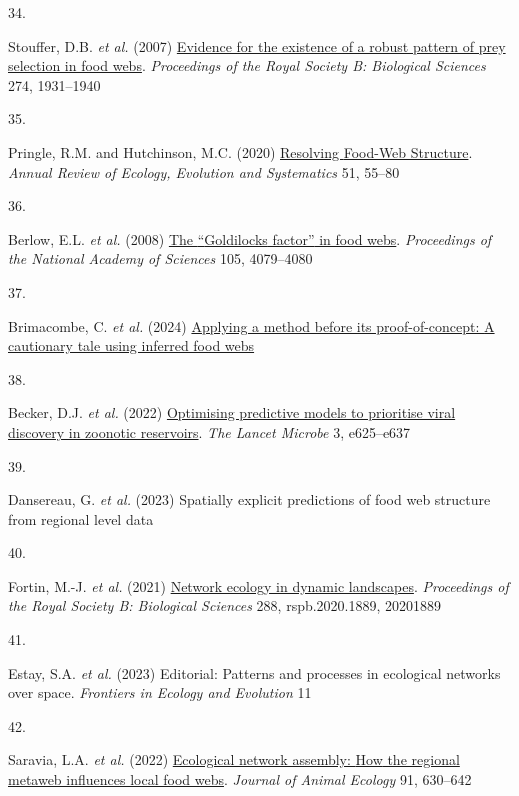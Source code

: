 \documentclass[
]{article}
\newlength{\cslhangindent}
\newlength{\csllabelwidth}
\newenvironment{CSLReferences}[2] %
 {\begin{list}{}{%
  \setlength{\itemindent}{0pt}
  \setlength{\leftmargin}{0pt}
  \setlength{\parsep}{0pt}
  \ifodd #1
   \setlength{\leftmargin}{\cslhangindent}
   \setlength{\itemindent}{-1\cslhangindent}
  \fi
  \setlength{\itemsep}{#2\baselineskip}}}
 {\end{list}}
\newcommand{\CSLLeftMargin}[1]{\parbox[t]{\csllabelwidth}{\strut#1\strut}}
\newcommand{\CSLRightInline}[1]{\parbox[t]{\linewidth - \csllabelwidth}{\strut#1\strut}}
\begin{document}
\begin{CSLReferences}{0}{0}
\CSLLeftMargin{34. }%
\CSLRightInline{Stouffer, D.B. \emph{et al.} (2007)
\href{https://doi.org/10.1098/rspb.2007.0571}{Evidence for the existence
of a robust pattern of prey selection in food webs}. \emph{Proceedings
of the Royal Society B: Biological Sciences} 274, 1931--1940}

\CSLLeftMargin{35. }%
\CSLRightInline{Pringle, R.M. and Hutchinson, M.C. (2020)
\href{https://doi.org/10.1146/annurev-ecolsys-110218-024908}{Resolving
{Food-Web Structure}}. \emph{Annual Review of Ecology, Evolution and
Systematics} 51, 55--80}

\CSLLeftMargin{36. }%
\CSLRightInline{Berlow, E.L. \emph{et al.} (2008)
\href{https://doi.org/10.1073/pnas.0800967105}{The {``{Goldilocks}
factor''} in food webs}. \emph{Proceedings of the National Academy of
Sciences} 105, 4079--4080}

\CSLLeftMargin{37. }%
\CSLRightInline{Brimacombe, C. \emph{et al.} (2024)
\href{https://doi.org/10.13140/RG.2.2.22076.65927}{Applying a method
before its proof-of-concept: {A} cautionary tale using inferred food
webs}}

\CSLLeftMargin{38. }%
\CSLRightInline{Becker, D.J. \emph{et al.} (2022)
\href{https://doi.org/10.1016/S2666-5247(21)00245-7}{Optimising
predictive models to prioritise viral discovery in zoonotic reservoirs}.
\emph{The Lancet Microbe} 3, e625--e637}

\CSLLeftMargin{39. }%
\CSLRightInline{Dansereau, G. \emph{et al.} (2023) Spatially explicit
predictions of food web structure from regional level data}

\CSLLeftMargin{40. }%
\CSLRightInline{Fortin, M.-J. \emph{et al.} (2021)
\href{https://doi.org/10.1098/rspb.2020.1889}{Network ecology in dynamic
landscapes}. \emph{Proceedings of the Royal Society B: Biological
Sciences} 288, rspb.2020.1889, 20201889}

\CSLLeftMargin{41. }%
\CSLRightInline{Estay, S.A. \emph{et al.} (2023) Editorial: {Patterns}
and processes in ecological networks over space. \emph{Frontiers in
Ecology and Evolution} 11}

\CSLLeftMargin{42. }%
\CSLRightInline{Saravia, L.A. \emph{et al.} (2022)
\href{https://doi.org/10.1111/1365-2656.13652}{Ecological network
assembly: {How} the regional metaweb influences local food webs}.
\emph{Journal of Animal Ecology} 91, 630--642}

\end{CSLReferences}
\end{document}
